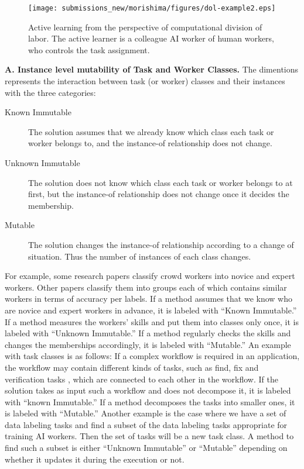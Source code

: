 \begin{figure}[t]
    \centering
    \texttt{[image: submissions\_new/morishima/figures/dol-example2.eps]}
    \caption{Active learning from the perspective of computational division of labor. The active learner is a colleague AI worker of human workers, who  controls the task assignment.}
    \label{fig:activelearning}
\end{figure}

\noindent
{\bf A. Instance level mutability of Task and Worker Classes.}
The dimentions represents the interaction between task (or worker) classes and their instances with  the three categories:

\begin{description}
\item[Known Immutable] The solution assumes that we already know which class each task or worker belongs to, and the instance-of relationship does not change.
\item[Unknown Immutable] The solution does not know which class each task or worker belongs to at first, but the instance-of relationship does not change once it decides the membership.
\item[Mutable] The solution changes the instance-of relationship according to a change of situation. Thus the number of instances of each class changes.
\end{description}

For example, some research papers classify crowd workers into novice and expert workers.
Other papers classify them into groups each of which contains similar workers in terms of accuracy per labels.
If a method assumes that we know who are  novice and expert workers in advance, it is labeled with ``Known Immutable.'' If a method measures the workers' skills and put them into classes only once, it is labeled with ``Unknown Immutable.'' If a method regularly checks the skills and changes the memberships accordingly, it is labeled with ``Mutable.''
An example with task classes is as follows: If a complex workflow is required in an application, the workflow may contain different kinds of tasks, such as find, fix  and  verification tasks  \cite{BLM+10}, which are connected to each other in the workflow.
If the solution takes as input such a workflow and does not decompose it, it is labeled with ``known Immutable.'' If a method decomposes the tasks into smaller ones, it is labeled with ``Mutable.''
Another example is the case where we have a set of data labeling tasks  and find a subset of the data labeling tasks  appropriate for training AI workers. Then the set of tasks will be a new task class. A method to find such a subset is either ``Unknown Immutable'' or ``Mutable'' depending on whether it updates it during the execution or not.\\

